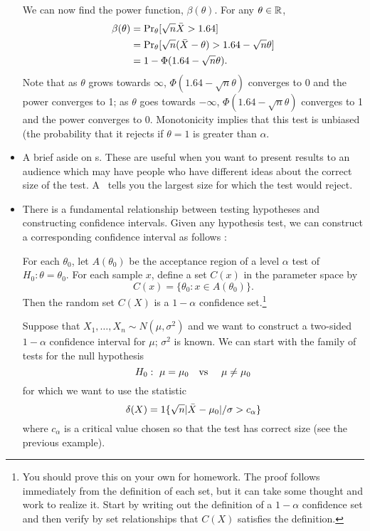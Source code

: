 \begin{itemize}[leftmargin=0pt]
\begin{ex}
    We can now find the power function, $\beta(\theta)$.  For any $\theta \in \mathbb{R}$,
    \begin{align*}
      \beta(\theta) &= \operatorname{Pr}_\theta[\sqrt{n} \bar{X} > 1.64] \\
      &= \operatorname{Pr}_\theta[\sqrt{n} (\bar{X} - \theta) > 1.64 - \sqrt{n} \theta] \\
      &= 1 - \Phi(1.64 - \sqrt{n} \theta).
    \end{align*}
    Note that as $\theta$ grows towards $\infty$, $\Phi(1.64 - \sqrt{n} \theta)$
    converges to 0 and the power converges to 1; as $\theta$ goes towards
    $-\infty$, $\Phi(1.64 - \sqrt{n} \theta)$ converges to 1 and the power
    converges to 0.  Monotonicity implies that this test is unbiased
    (the probability that it rejects if $\theta = 1$ is greater than $\alpha$.
  \end{ex}

\item A brief aside on \pvalue s.  These are useful when you want to
  present results to an audience which may have people who have
  different ideas about the correct size of the test.  A \pvalue\
  tells you the largest size for which the test would reject.

\item There is a fundamental relationship between testing hypotheses
  and constructing confidence intervals.  Given any hypothesis test, we
  can construct a corresponding confidence interval as
  follows \citep[As described in][Section 9.2]{CB02}:

  For each $\theta_0$, let $A(\theta_0)$ be the acceptance region of a level $\alpha$
  test of $H_0: \theta = \theta_0$.  For each sample $x$, define a set $C(x)$ in
  the parameter space by \[C(x) = \{\theta_0: x \in A(\theta_0)\}.\]  Then the
  random set $C(X)$ is a $1-\alpha$ confidence set.\footnote{You should
    prove this on your own for homework.  The proof follows
    immediately from the definition of each set, but it can take some
    thought and work to realize it.  Start by writing out the
    definition of a $1-\alpha$ confidence set and then verify by set
    relationships that $C(X)$ satisfies the definition.}

  \begin{ex}
    Suppose that $X_1,\dots,X_n \sim N(\mu,\sigma^2)$ and we want to construct a
    two-sided $1-\alpha$ confidence interval for $\mu$; $\sigma^2$ is known.  We
    can start with the family of tests for the null hypothesis
    \begin{equation*}
      H_0:\ \mu = \mu_0 \text{\quad vs \quad} \mu \neq \mu_0
    \end{equation*}
    for which we want to use the statistic
    \begin{equation*}
      \delta(X) = \operatorname{1}\{\sqrt{n} |\bar{X} - \mu_0| / \sigma > c_\alpha\}
    \end{equation*}
    where $c_\alpha$ is a critical value chosen so that the test has
    correct size (see the previous example).


\end{ex}
\end{itemize}
